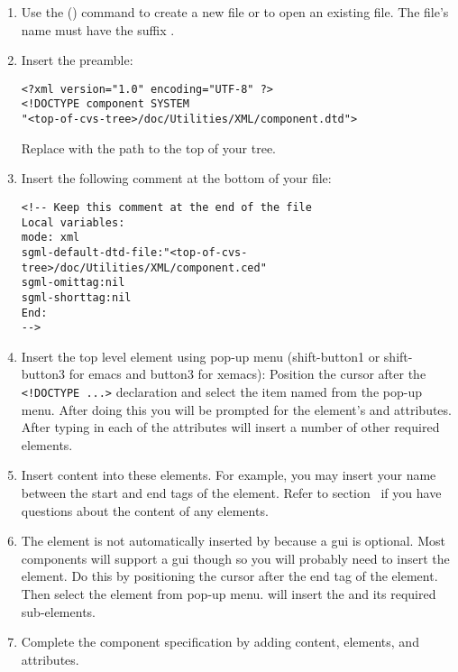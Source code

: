 \documentclass[11pt]{article}
\begin{document}
\begin{enumerate}
\item Use the  () command to create a
  new file or to open an existing file.  The file's name must have the
  suffix .
\item Insert the preamble:
\begin{verbatim}
<?xml version="1.0" encoding="UTF-8" ?>
<!DOCTYPE component SYSTEM 
"<top-of-cvs-tree>/doc/Utilities/XML/component.dtd">
\end{verbatim}
  Replace  with the path to the top of your
  \sr{} \cvs{} tree.
\item Insert the following \xml{} comment at the bottom of your file:
\begin{verbatim}
<!-- Keep this comment at the end of the file
Local variables:
mode: xml
sgml-default-dtd-file:"<top-of-cvs-tree>/doc/Utilities/XML/component.ced"
sgml-omittag:nil
sgml-shorttag:nil
End:
-->
\end{verbatim}
  
\item Insert the top level  element using \emacs{}
  pop-up menu (shift-button1 or shift-button3 for emacs and button3 for
  xemacs): Position the cursor after the \verb+<!DOCTYPE ...>+ declaration
  and select the item named  from the pop-up menu.
  After doing this you will be prompted for the 
  element's  and  attributes. After
  typing in each of the attributes \Emacs{} will  insert a number of
  other required elements.
\item Insert content into these elements.  For example, you may insert your
  name between the start and end tags of the  element.
  Refer to section~\sechyperref{\SECcontent} if you have questions about
  the content of any elements.
\item The  element is not automatically inserted by \emacs{} 
  because a gui is optional.  Most components will support a gui
  though so you will probably need to insert the 
  element.  Do this by positioning the cursor after the end tag of
  the  element.  Then select the  element
  from \emacs{} pop-up menu.  \Emacs{} will insert the 
  and its required sub-elements.
\item Complete the component specification by adding content, elements, and
  attributes.
\end{enumerate}
\end{document}

